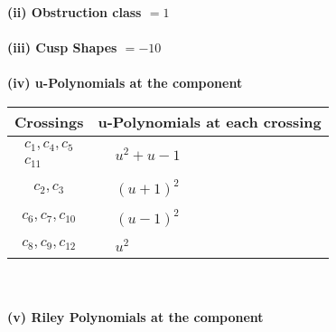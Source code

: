 \documentclass[1p]{elsarticle_modified}
\theoremstyle{definition}
\begin{document}
\flushleft \textbf{(ii) Obstruction class $= 1$}\\~\\
\flushleft \textbf{(iii) Cusp Shapes $= -10$}\\~\\
\newpage\renewcommand{\arraystretch}{1}
\flushleft \textbf{(iv) u-Polynomials at the component}\newline \\
\begin{tabular}{m{50pt}|m{274pt}}
Crossings & \hspace{64pt}u-Polynomials at each crossing \\
\hline $$\begin{aligned}c_{1},c_{4},c_{5}\\c_{11}\end{aligned}$$&$\begin{aligned}
&u^2+u-1
\end{aligned}$\\
\hline $$\begin{aligned}c_{2},c_{3}\end{aligned}$$&$\begin{aligned}
&(u+1)^2
\end{aligned}$\\
\hline $$\begin{aligned}c_{6},c_{7},c_{10}\end{aligned}$$&$\begin{aligned}
&(u-1)^2
\end{aligned}$\\
\hline $$\begin{aligned}c_{8},c_{9},c_{12}\end{aligned}$$&$\begin{aligned}
&u^2
\end{aligned}$\\
\hline
\end{tabular}\\~\\
\newpage\renewcommand{\arraystretch}{1}
\flushleft \textbf{(v) Riley Polynomials at the component}\newline \\
\end{document}
